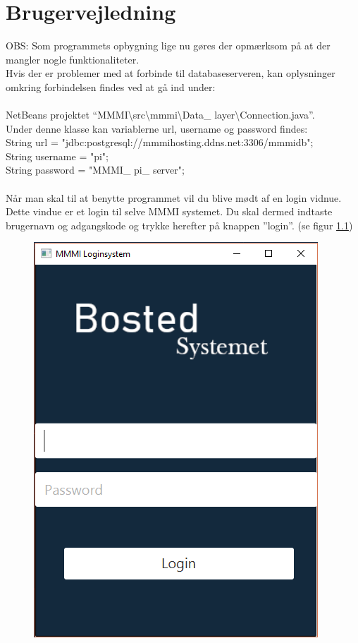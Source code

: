 \chapter{Brugervejledning}
OBS: Som programmets opbygning lige nu gøres der opmærksom på at der mangler nogle funktionaliteter. \\
Hvis der er problemer med at forbinde til databaseserveren, kan oplysninger omkring forbindelsen findes ved at gå ind under:\\ 
\\
NetBeans projektet “MMMI\textbackslash src\textbackslash mmmi\textbackslash Data\_ layer\textbackslash Connection.java”.\\
Under denne klasse kan variablerne url, username og password findes:\\
String url = "jdbc:postgresql://mmmihosting.ddns.net:3306/mmmidb";\\
String username = "pi";\\
String password = "MMMI\_ pi\_ server";\\
\\
Når man skal til at benytte programmet vil du blive mødt af en login vidnue. Dette vindue er et login til selve MMMI systemet. Du skal dermed indtaste brugernavn og adgangskode og trykke herefter på knappen ”login”. (se figur \ref{bru:f1})\\
\begin{center}
\begin{figure}[h]
  \includegraphics[scale=0.3]{./PNG/brugervejledning/figur1.PNG} 
  \caption{}
  \label{bru:f1}
\end{figure}
\end{center}
